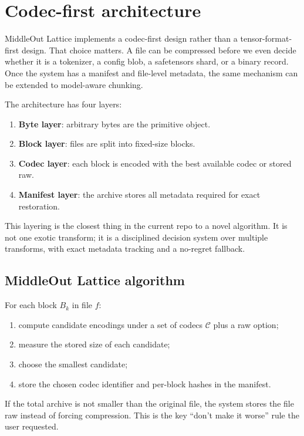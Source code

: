\documentclass[11pt]{article}
\begin{document}
\section{Codec-first architecture}

MiddleOut Lattice implements a codec-first design rather than a tensor-format-first design. That choice matters. A file can be compressed before we even decide whether it is a tokenizer, a config blob, a safetensors shard, or a binary record. Once the system has a manifest and file-level metadata, the same mechanism can be extended to model-aware chunking.

The architecture has four layers:
\begin{enumerate}
\item \textbf{Byte layer}: arbitrary bytes are the primitive object.
\item \textbf{Block layer}: files are split into fixed-size blocks.
\item \textbf{Codec layer}: each block is encoded with the best available codec or stored raw.
\item \textbf{Manifest layer}: the archive stores all metadata required for exact restoration.
\end{enumerate}

This layering is the closest thing in the current repo to a novel algorithm. It is not one exotic transform; it is a disciplined decision system over multiple transforms, with exact metadata tracking and a no-regret fallback.

\subsection{MiddleOut Lattice algorithm}
For each block $B_k$ in file $f$:
\begin{enumerate}
\item compute candidate encodings under a set of codecs $\mathcal{C}$ plus a raw option;
\item measure the stored size of each candidate;
\item choose the smallest candidate;
\item store the chosen codec identifier and per-block hashes in the manifest.
\end{enumerate}

If the total archive is not smaller than the original file, the system stores the file raw instead of forcing compression. This is the key ``don't make it worse'' rule the user requested.
\end{document}
